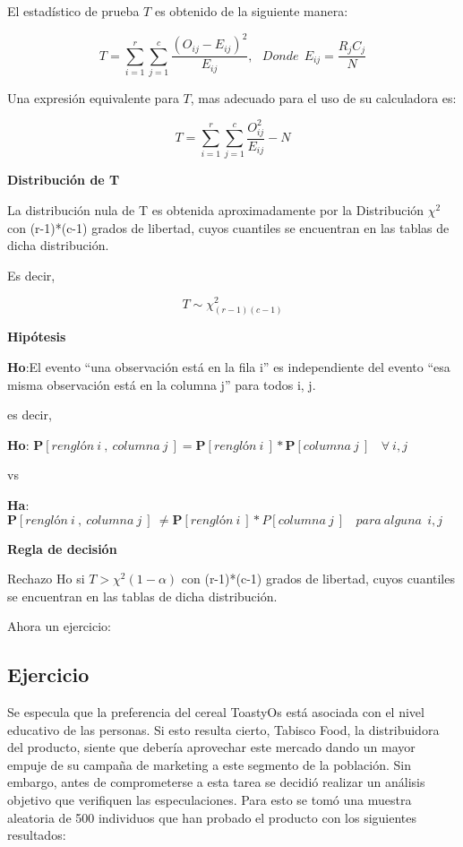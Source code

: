 \documentclass[a4paper,oneside,openany]{book}
\begin{document}
El estadístico de prueba \(T\) es obtenido de la siguiente manera:

\[T=\sum_{i=1}^{r}\sum_{j=1}^{c}\frac{(O_{ij}-E_{ij})^2}{E_{ij}}, \ \ \ Donde\ \ E_{ij}=\frac{R_{j}C_{j}}{N}\]

Una expresión equivalente para \(T\), mas adecuado para el uso de su
calculadora es:

\[T=\sum_{i=1}^{r}\sum_{j=1}^{c}\frac{O_{ij}^{2}}{E_{ij}}-N\]

\textbf{Distribución de T}

La distribución nula de T es obtenida aproximadamente por la
Distribución \(\chi^2\) con (r-1)*(c-1) grados de libertad, cuyos
cuantiles se encuentran en las tablas de dicha distribución.

Es decir,

\[T\sim \chi^2_{(r-1)(c-1)}\]

\textbf{Hipótesis}

\textbf{Ho}:El evento ``una observación está en la fila i'' es
independiente del evento ``esa misma observación está en la columna j''
para todos i, j.

es decir,

\textbf{Ho}:
\(\mathbf{P}[renglón\ i\ ,\ columna\ j\ ]= \mathbf{P}[renglón\ i\ ]*\mathbf{P}[columna\ j\ ]\ \ \ \ \forall\ i,j\)

vs

\textbf{Ha}:\(\mathbf{P}[renglón\ i\ ,\ columna\ j\ ]\ \neq \mathbf{P}[renglón\ i\ ]*P[columna\ j\ ]\ \ \ \ para\ alguna\ \ i,j\)

\textbf{Regla de decisión}

Rechazo Ho si \(T> \chi^2(1-\alpha)\) con (r-1)*(c-1) grados de
libertad, cuyos cuantiles se encuentran en las tablas de dicha
distribución.

Ahora un ejercicio:

\subsection{Ejercicio}\label{ejercicio}

Se especula que la preferencia del cereal ToastyOs está asociada con el
nivel educativo de las personas. Si esto resulta cierto, Tabisco Food,
la distribuidora del producto, siente que debería aprovechar este
mercado dando un mayor empuje de su campaña de marketing a este segmento
de la población. Sin embargo, antes de comprometerse a esta tarea se
decidió realizar un análisis objetivo que verifiquen las especulaciones.
Para esto se tomó una muestra aleatoria de 500 individuos que han
probado el producto con los siguientes resultados:
\end{document}
